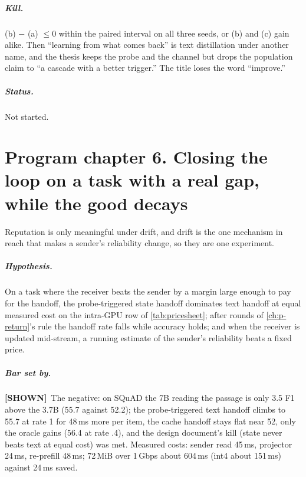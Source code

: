 \documentclass[11pt,a4paper]{report}
\newcommand{\SHOWN}{\textcolor{shownc}{\textbf{\scriptsize[SHOWN]}}}
\newcommand{\BET}{\textcolor{betc}{\textbf{\scriptsize[BET]}}}
\newcommand{\mbet}{\marginnote{\BET}}
\begin{document}
\paragraph{Kill.} (b) $-$ (a) $\le 0$ within the paired interval on all three seeds, or (b) and (c) gain alike. Then ``learning from what comes back'' is text distillation under another name, and the thesis keeps the probe and the channel but drops the population claim to ``a cascade with a better trigger.'' The title loses the word ``improve.''

\paragraph{Status.} Not started.

\chapter{Program chapter 6. Closing the loop on a task with a real gap, while the good decays}
\label{ch:p-loop}

Reputation is only meaningful under drift, and drift is the one mechanism in reach that makes a sender's reliability change, so they are one experiment.

\paragraph{Hypothesis.} \mbet On a task where the receiver beats the sender by a margin large enough to pay for the handoff, the probe-triggered state handoff dominates text handoff at equal measured cost on the intra-GPU row of \cref{tab:pricesheet}; after rounds of \cref{ch:p-return}'s rule the handoff rate falls while accuracy holds; and when the receiver is updated mid-stream, a running estimate of the sender's reliability beats a fixed price.

\paragraph{Bar set by.} \SHOWN\ The negative: on SQuAD the 7B reading the passage is only 3.5 F1 above the 3.7B (55.7 against 52.2); the probe-triggered text handoff climbs to 55.7 at rate 1 for 48\,ms more per item, the cache handoff stays flat near 52, only the oracle gains (56.4 at rate .4), and the design document's kill (state never beats text at equal cost) was met. Measured costs: sender read 45\,ms, projector 24\,ms, re-prefill 48\,ms; 72\,MiB over 1\,Gbps about 604\,ms (int4 about 151\,ms) against 24\,ms saved.
\end{document}
